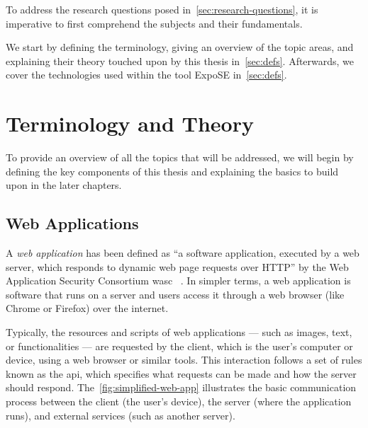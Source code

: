 To address the research questions posed in~\autoref{sec:research-questions}, it is imperative to first comprehend the subjects and their fundamentals. 

We start by defining the terminology, giving an overview of the topic areas, and explaining their theory touched upon by this thesis in~\autoref{sec:defs}. Afterwards, we cover the technologies used within the tool ExpoSE in~\autoref{sec:defs}.

\section{Terminology and Theory}
\label{sec:defs}
To provide an overview of all the topics that will be addressed, we will begin by defining the key components of this thesis and explaining the basics to build upon in the later chapters. 

\subsection{Web Applications}
\label{sec:webapp}
A \textit{web application} has been defined as “a software application, executed by a web server, which responds to dynamic web page requests over HTTP” by the Web Application Security Consortium \gls{wasc} ~\cite{noauthor_web_2012}. 
In simpler terms, a web application is software that runs on a server and users access it through a web browser (like Chrome or Firefox) over the internet.

Typically, the resources and scripts of web applications — such as images, text, or functionalities — are requested by the client, which is the user's computer or device, using a web browser or similar tools. This interaction follows a set of rules known as the \gls{api}, which specifies what requests can be made and how the server should respond.
The~\autoref{fig:simplified-web-app} illustrates the basic communication process between the client (the user's device), the server (where the application runs), and external services (such as another server).

